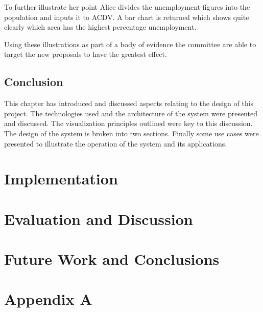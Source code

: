 \documentclass[a4paper, 11pt, titlepage, onehalfspacing]{report}
\begin{document}
To further illustrate her point Alice divides the unemployment figures into the population and inputs it to AC\lightning{}DV. A bar chart is returned which shows quite clearly which area has the highest percentage unemployment. 

Using these illustrations as part of a body of evidence the committee are able to target the new proposals to have the greatest effect.


\section{Conclusion}
This chapter has introduced and discussed aspects relating to the design of this project. The technologies used and the architecture of the system were presented and discussed. The visualization principles outlined were key to this discussion. The design of the system is broken into two sections. Finally some use cases were presented to illustrate the operation of the system and its applications.



\chapter{Implementation}


\chapter{Evaluation and Discussion}


\chapter{Future Work and Conclusions}




\appendix
\chapter{Appendix A}
\end{document}
